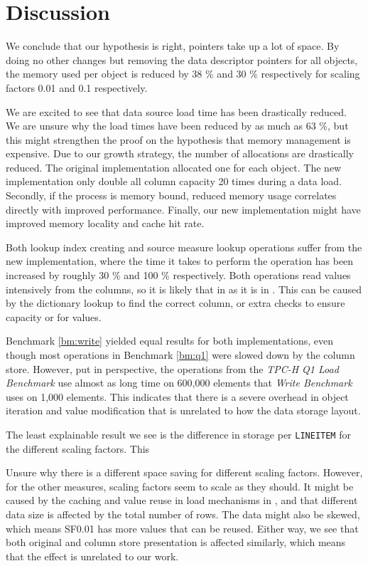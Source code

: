 \section{Discussion}
\label{sec:Discussion}
We conclude that our hypothesis is right, pointers take up a lot of space. By doing no other changes but removing the data descriptor pointers for all objects, the memory used per object is reduced by 38 \% and 30 \% respectively for scaling factors 0.01 and 0.1 respectively. 

We are excited to see that data source load time has been drastically reduced. We are unsure why the load times have been reduced by as much as 63 \%, but this might strengthen the proof on the hypothesis that memory management is expensive. Due to our growth strategy, the number of allocations are drastically reduced. The original implementation allocated one  for each object. The new implementation only double all column capacity 20 times during a data load. Secondly, if the process is memory bound, reduced memory usage correlates directly with improved performance. Finally, our new implementation might have improved memory locality and cache hit rate. 

Both lookup index creating and source measure lookup operations suffer from the new implementation, where the time it takes to perform the operation has been increased by roughly 30 \% and 100 \% respectively. Both operations read values intensively from the columns, so it is likely that  in  as it is in . This can be caused by the dictionary lookup to find the correct column, or extra checks to ensure capacity or for  values.

Benchmark \ref{bm:write} yielded equal results for both implementations, even though most operations in Benchmark \ref{bm:q1} were slowed down by the column store. However, put in perspective, the operations from the \textit{TPC-H Q1 Load Benchmark} use almost as long time on 600,000 elements that \textit{Write Benchmark} uses on 1,000 elements. This indicates that there is a severe overhead in object iteration and value modification that is unrelated to how the data storage layout.

The least explainable result we see is the difference in storage per \texttt{LINEITEM} for the different scaling factors. This 

Unsure why there is a different space saving for different scaling factors. However, for the other measures, scaling factors seem to scale as they should. It might be caused by the caching and value reuse in load mechanisms in \gap, and that different data size is affected by the total number of rows. The data might also be skewed, which means SF0.01 has more values that can be reused. Either way, we see that both original and column store presentation is affected similarly, which means that the effect is unrelated to our work.

